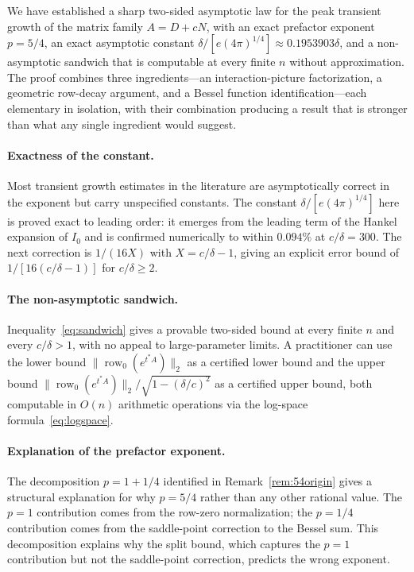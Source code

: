 \documentclass[11pt,reqno]{article}
\theoremstyle{plain}
\theoremstyle{definition}
\theoremstyle{remark}
\numberwithin{equation}{section}
\begin{document}
We have established a sharp two-sided asymptotic law for the peak transient growth of the matrix family $A = D + cN$, with an exact prefactor exponent $p = 5/4$, an exact asymptotic constant $\delta/[e(4\pi)^{1/4}] \approx 0.1953903\delta$, and a non-asymptotic sandwich that is computable at every finite $n$ without approximation. The proof combines three ingredients---an interaction-picture factorization, a geometric row-decay argument, and a Bessel function identification---each elementary in isolation, with their combination producing a result that is stronger than what any single ingredient would suggest.

\paragraph{Exactness of the constant.} Most transient growth estimates in the literature are asymptotically correct in the exponent but carry unspecified constants. The constant $\delta/[e(4\pi)^{1/4}]$ here is proved exact to leading order: it emerges from the leading term of the Hankel expansion of $I_0$ and is confirmed numerically to within $0.094\%$ at $c/\delta = 300$. The next correction is $1/(16X)$ with $X = c/\delta - 1$, giving an explicit error bound of $1/[16(c/\delta - 1)]$ for $c/\delta \ge 2$.

\paragraph{The non-asymptotic sandwich.} Inequality~\eqref{eq:sandwich} gives a provable two-sided bound at every finite $n$ and every $c/\delta > 1$, with no appeal to large-parameter limits. A practitioner can use the lower bound $\|\operatorname{row}_0(e^{t^*A})\|_2$ as a certified lower bound and the upper bound $\|\operatorname{row}_0(e^{t^*A})\|_2/\sqrt{1-(\delta/c)^2}$ as a certified upper bound, both computable in $O(n)$ arithmetic operations via the log-space formula~\eqref{eq:logspace}.

\paragraph{Explanation of the prefactor exponent.} The decomposition $p = 1 + 1/4$ identified in Remark~\ref{rem:54origin} gives a structural explanation for why $p = 5/4$ rather than any other rational value. The $p = 1$ contribution comes from the row-zero normalization; the $p = 1/4$ contribution comes from the saddle-point correction to the Bessel sum. This decomposition explains why the split bound, which captures the $p = 1$ contribution but not the saddle-point correction, predicts the wrong exponent.
\end{document}
